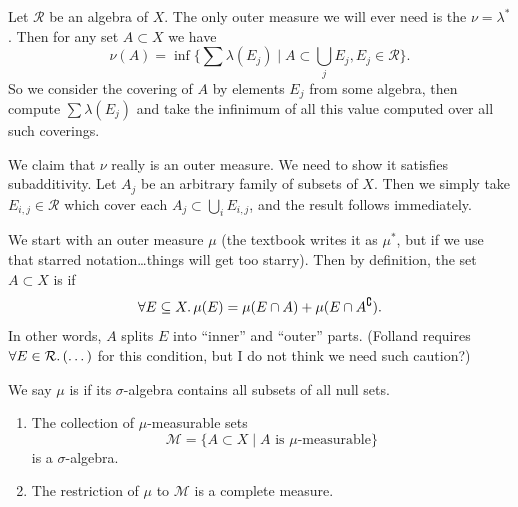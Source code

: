 \begin{example}
Let $\mathcal{R}$ be an algebra of $X$.
The only outer measure we will ever need is the 
$\nu=\lambda^{*}$. Then for any set $A\subset X$ we have
\begin{equation}
\nu(A)=\inf\{\sum\lambda(E_{j})\mid A\subset\bigcup_{j}E_{j}, E_{j}\in\mathcal{R}\}.
\end{equation}
So we consider the covering of $A$ by elements $E_{j}$ from some
algebra, then compute $\sum\lambda(E_{j})$ and take the infinimum of
all this value computed over all such coverings.

We claim that $\nu$ really is an outer measure. We need to show it
satisfies subadditivity. Let $A_{j}$ be an arbitrary family of subsets
of $X$. Then we simply take $E_{i,j}\in\mathcal{R}$ which cover each
$A_{j}\subset\bigcup_{i}E_{i,j}$, and the result follows immediately.
\end{example}

\begin{definition}
We start with an outer measure $\mu$ (the textbook writes it as
$\mu^{*}$, but if we use that starred notation\dots things will get
too starry). Then by definition, the set $A\subset X$ is
 if
\begin{equation}
\forall E\subset X\ldotp\mu(E)=\mu(E\cap A)+\mu(E\cap A^{\complement}).
\end{equation}
In other words, $A$ splits $E$ into ``inner'' and ``outer'' parts.
(Folland requires $\forall E\in\mathcal{R}\ldotp(\dots)$ for this
condition, but I do not think we need such caution?)
\end{definition}

\begin{definition}
We say $\mu$ is  if its $\sigma$-algebra contains all
subsets of all null sets.
\end{definition}

\begin{theorem}
\begin{enumerate}
\item The collection of $\mu$-measurable sets
  \begin{equation}
\mathcal{M}=\{A\subset X\mid A\mbox{ is $\mu$-measurable}\}
  \end{equation}
  is a $\sigma$-algebra.
\item The restriction of $\mu$ to $\mathcal{M}$ is a complete measure.
\end{enumerate}
\end{theorem}

